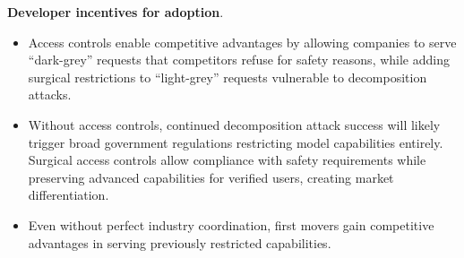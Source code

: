 \documentclass{article}
\theoremstyle{plain}
\theoremstyle{definition}
\theoremstyle{remark}
\begin{document}
\textbf{Developer incentives for adoption}.
\begin{itemize}
  \item Access controls enable competitive advantages by allowing companies to serve ``dark-grey'' requests that competitors refuse for safety reasons, while adding surgical restrictions to ``light-grey'' requests vulnerable to decomposition attacks.
  \item Without access controls, continued decomposition attack success will likely trigger broad government regulations restricting model capabilities entirely.  Surgical access controls allow compliance with safety requirements while preserving advanced capabilities for verified users, creating market differentiation.
  \item Even without perfect industry coordination, first movers gain competitive advantages in serving previously restricted capabilities.
\end{itemize}
\end{document}
